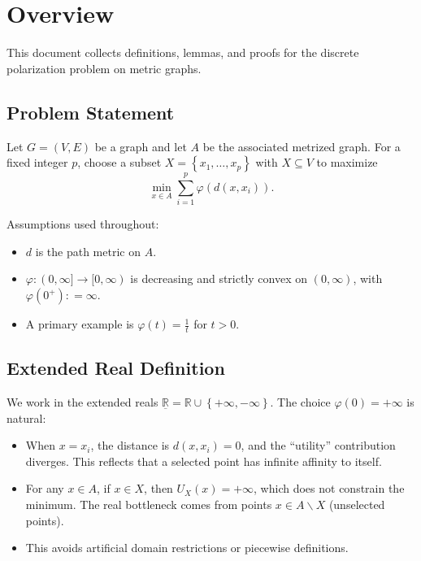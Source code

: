 \documentclass[
]{article}
\author{}
\date{}
\begin{document}
\section{Overview}

This document collects definitions, lemmas, and proofs for the discrete
polarization problem on metric graphs.

\subsection{Problem Statement}

Let \(G = (V,E)\) be a graph and let \(A\) be the associated metrized
graph. For a fixed integer \(p\), choose a subset
\(X = \left\{ x_{1},\ldots,x_{p} \right\}\) with \(X \subseteq V\) to
maximize
\[\min_{x \in A}\sum_{i = 1}^{p}\varphi(d\left( x,x_{i} \right)).\]

Assumptions used throughout:

\begin{itemize}
\item
  \(d\) is the path metric on \(A\).
\item
  \(\varphi:(0,\infty\rbrack \rightarrow \lbrack 0,\infty)\) is
  decreasing and strictly convex on \((0,\infty)\), with
  \(\varphi(0^{+}): = \infty\).
\item
  A primary example is \(\varphi(t) = \frac{1}{t}\) for \(t > 0\).
\end{itemize}

\subsection{Extended Real Definition}

We work in the extended reals
\(\underset{¯}{\mathbb{R}} = {\mathbb{R}} \cup \left\{ + \infty, - \infty \right\}\).
The choice \(\varphi(0) = + \infty\) is natural:

\begin{itemize}
\item
  When \(x = x_{i}\), the distance is \(d\left( x,x_{i} \right) = 0\),
  and the ``utility'' contribution diverges. This reflects that a
  selected point has infinite affinity to itself.
\item
  For any \(x \in A\), if \(x \in X\), then \(U_{X}(x) = + \infty\),
  which does not constrain the minimum. The real bottleneck comes from
  points \(x \in A\backslash X\) (unselected points).
\item
  This avoids artificial domain restrictions or piecewise definitions.
\end{itemize}
\end{document}
